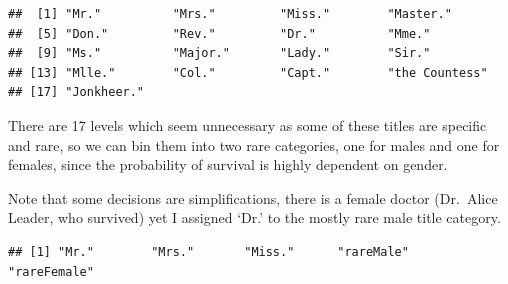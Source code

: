 \documentclass[]{article}
\newenvironment{Shaded}{\begin{snugshade}}{\end{snugshade}}
\newcommand{\KeywordTok}[1]{\textcolor[rgb]{0.13,0.29,0.53}{\textbf{#1}}}
\newcommand{\DecValTok}[1]{\textcolor[rgb]{0.00,0.00,0.81}{#1}}
\newcommand{\StringTok}[1]{\textcolor[rgb]{0.31,0.60,0.02}{#1}}
\newcommand{\CommentTok}[1]{\textcolor[rgb]{0.56,0.35,0.01}{\textit{#1}}}
\newcommand{\ControlFlowTok}[1]{\textcolor[rgb]{0.13,0.29,0.53}{\textbf{#1}}}
\newcommand{\OperatorTok}[1]{\textcolor[rgb]{0.81,0.36,0.00}{\textbf{#1}}}
\newcommand{\NormalTok}[1]{#1}
\begin{document}
\begin{verbatim}
##  [1] "Mr."          "Mrs."         "Miss."        "Master."     
##  [5] "Don."         "Rev."         "Dr."          "Mme."        
##  [9] "Ms."          "Major."       "Lady."        "Sir."        
## [13] "Mlle."        "Col."         "Capt."        "the Countess"
## [17] "Jonkheer."
\end{verbatim}

There are 17 levels which seem unnecessary as some of these titles are
specific and rare, so we can bin them into two rare categories, one for
males and one for females, since the probability of survival is highly
dependent on gender.

Note that some decisions are simplifications, there is a female doctor
(Dr.~Alice Leader, who survived) yet I assigned `Dr.' to the mostly rare
male title category.

\begin{Shaded}
\end{Shaded}

\begin{verbatim}
## [1] "Mr."        "Mrs."       "Miss."      "rareMale"   "rareFemale"
\end{verbatim}
\end{document}
